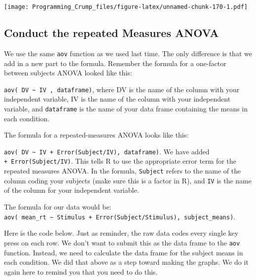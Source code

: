 \documentclass[]{book}
\theoremstyle{definition}
\theoremstyle{definition}
\theoremstyle{definition}
\theoremstyle{remark}
\begin{document}
\texttt{[image: Programming\_Crump\_files/figure-latex/unnamed-chunk-170-1.pdf]}

\subsection{Conduct the repeated Measures
ANOVA}\label{conduct-the-repeated-measures-anova}

We use the same \texttt{aov} function as we used last time. The only
difference is that we add in a new part to the formula. Remember the
formula for a one-factor between subjects ANOVA looked like this:

\texttt{aov(\ DV\ \textasciitilde{}\ IV\ ,\ dataframe)}, where DV is the
name of the column with your independent variable, IV is the name of the
column with your independent variable, and \texttt{dataframe} is the
name of your data frame containing the means in each condition.

The formula for a repeated-measures ANOVA looks like this:

\texttt{aov(\ DV\ \textasciitilde{}\ IV\ +\ Error(Subject/IV),\ dataframe)}.
We have added \texttt{+\ Error(Subject/IV)}. This tells R to use the
appropriate error term for the repeated measures ANOVA. In the formula,
\texttt{Subject} refers to the name of the column coding your subjects
(make sure this is a factor in R), and \texttt{IV} is the name of the
column for your independent variable.

The formula for our data would be:
\texttt{aov(\ mean\_rt\ \textasciitilde{}\ Stimulus\ +\ Error(Subject/Stimulus),\ subject\_means)}.

Here is the code below. Just as reminder, the raw data codes every
single key press on each row. We don't want to submit this as the data
frame to the \texttt{aov} function. Instead, we need to calculate the
data frame for the subject means in each condition. We did that above as
a step toward making the graphs. We do it again here to remind you that
you need to do this.
\end{document}
